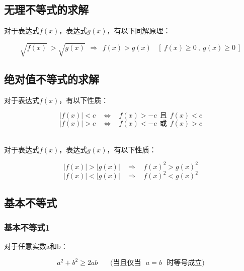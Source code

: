 \documentclass[UTF8]{ctexart}
\begin{document}
\subsection{无理不等式的求解}
    对于表达式$f(x)$，表达式$g(x)$，有以下同解原理：\\[1mm]
    \begin{large}
        \begin{equation*}
            \sqrt{f(x)}~>\sqrt{g(x)}~~\Rightarrow~~f(x)>g(x)~~~~\left[~f(x)\ge 0~,~g(x)\ge 0~\right]
        \end{equation*}
    \end{large}

\newpage

\subsection{绝对值不等式的求解}
    对于表达式$f(x)$，有以下性质：
    \begin{large}
        \begin{equation*}
            \left|f(x)\right|<c~~~~\Leftrightarrow~~~~f(x)>-c~~\text{且}~~f(x)<c
        \end{equation*}
        \begin{equation*}
            \left|f(x)\right|>c~~~~\Leftrightarrow~~~~f(x)<-c~~\text{或}~~f(x)>c
        \end{equation*}
    \end{large}\\
    对于表达式$f(x)$，表达式$g(x)$，有以下性质：
    \begin{large}
        \begin{equation*}
            \left|f(x)\right|>\left|g(x)\right|~~~~\Rightarrow~~~~f(x)^2>g(x)^2
        \end{equation*}
        \begin{equation*}
            \left|f(x)\right|<\left|g(x)\right|~~~~\Rightarrow~~~~f(x)^2<g(x)^2
        \end{equation*}
    \end{large}

\subsection{基本不等式}

\subsubsection{基本不等式1}
    对于任意实数a和b：
    \begin{large}
        \begin{equation*}
            a^2+b^2\ge 2ab~~~~~~~~\text{(当且仅当~~}a=b\text{~~时等号成立)}
        \end{equation*}
    \end{large}
\end{document}
